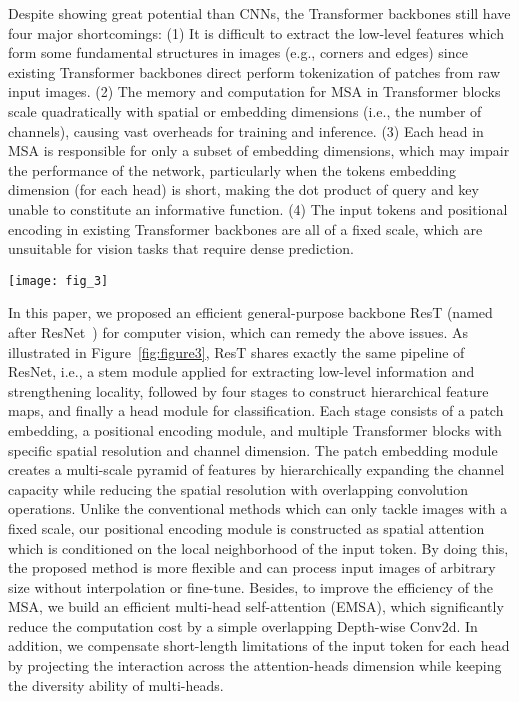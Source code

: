 \documentclass{article}
\begin{document}
Despite showing great potential than CNNs, the Transformer backbones still have four major shortcomings: 
(1) It is difficult to extract the low-level features which form some fundamental structures in images (e.g., corners and edges) since existing Transformer backbones direct perform tokenization of patches from raw input images.
(2) The memory and computation for MSA in Transformer blocks scale quadratically with spatial or embedding dimensions (i.e., the number of channels), causing vast overheads for training and inference.
(3) Each head in MSA is responsible for only a subset of embedding dimensions, which may impair the performance of the network, particularly when the tokens embedding dimension (for each head) is short, making the dot product of query and key unable to constitute an informative function.  
(4) The input tokens and positional encoding in existing Transformer backbones are all of a fixed scale, which are unsuitable for vision tasks that require dense prediction. 





\begin{figure*}[htb]
	\begin{center}
		\texttt{[image: fig\_3]}
	\end{center}
	\caption{The pipeline of the proposed ResT. Similar to ResNet~\cite{DBLP:conf/cvpr/HeZRS16}, ResT build stages with stacked blocks, making it flexible to serve as the backbone of downstream tasks, such as Object detection, Person ReID, and Instance Segmentation, etc.}
	\label{fig:figure3}
\end{figure*}

In this paper, we proposed an efficient general-purpose backbone ResT (named after ResNet~\cite{DBLP:conf/cvpr/HeZRS16}) for computer vision, which can remedy the above issues. As illustrated in Figure~\ref{fig:figure3}, ResT shares exactly the same pipeline of ResNet, i.e., a stem module applied for extracting low-level information and strengthening locality, followed by four stages to construct hierarchical feature maps, and finally a head module for classification. Each stage consists of a patch embedding, a positional encoding module, and multiple Transformer blocks with specific spatial resolution and channel dimension. 
The patch embedding module creates a multi-scale pyramid of features by hierarchically expanding the channel capacity while reducing the spatial resolution with overlapping convolution operations. Unlike the conventional methods which can only tackle images with a fixed scale, our positional encoding module is constructed as spatial attention which is conditioned on the local neighborhood of the input token. By doing this, the proposed method is more flexible and can process input images of arbitrary size without interpolation or fine-tune. Besides, to improve the efficiency of the MSA, we build an efficient multi-head self-attention (EMSA), which significantly reduce the computation cost by a simple overlapping Depth-wise Conv2d. In addition, we compensate short-length limitations of the input token for each head by projecting the interaction across the attention-heads dimension while keeping the diversity ability of multi-heads.
\end{document}
